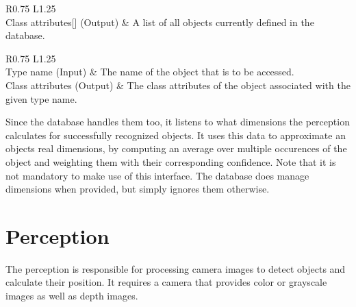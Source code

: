 \begin{table}[H]
  \centering
  \caption[Database getter interfaces]{Interfaces to access the contents of the database.}
  \label{tab:db-get-all}
  \renewcommand{\arraystretch}{1.5}
  \begin{subtable}[t]{.495\linewidth}
    \vspace{0pt}
    \begin{tabularx}{\textwidth}{R{0.75} L{1.25}}
      \hline
       \\
      \hline
      Class attributes[] (Output) & A list of all objects currently defined in the database. \\
      \hline
    \end{tabularx}
  \end{subtable}%
  \hfill
  \begin{subtable}[t]{.495\linewidth}
    \vspace{0pt}
    \begin{tabularx}{\textwidth}{R{0.75} L{1.25}}
      \hline
       \\
      \hline
      Type name (Input) & The name of the object that is to be accessed. \\
      Class attributes (Output) & The class attributes of the object associated with the given type name. \\
      \hline
    \end{tabularx}
  \end{subtable}%
\end{table}

Since the database handles them too, it listens to what dimensions the perception calculates for successfully recognized objects. It uses this data to approximate an objects real dimensions, by computing an average over multiple occurences of the object and weighting them with their corresponding confidence. Note that it is not mandatory to make use of this interface. The database does manage dimensions when provided, but simply ignores them otherwise.

\section{Perception} %
\label{sec:arch-perception}
The perception is responsible for processing camera images to detect objects and calculate their position. It requires a camera that provides color or grayscale images as well as depth images. \\

